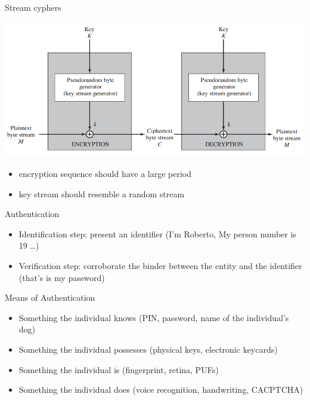\documentclass{beamer}
\begin{document}
\begin{frame}{Stream cyphers}
  \begin{center}
    \includegraphics[width=0.8\linewidth]{stream}
  \end{center}
  \begin{itemize}
    \item  encryption sequence should have a large period 
    \item  key stream should resemble a random stream
  \end{itemize}
\end{frame}

\begin{frame}{Authentication}
  \begin{itemize}
    \item Identification step: present an identifier (I'm Roberto, My person number is 19 \dots) 
    \item Verification step: corroborate the binder between the entity and the identifier (that's is my password)
  \end{itemize}
\end{frame}

\begin{frame}{Means of Authentication}
  \begin{itemize}
    \item Something the individual knows (PIN, password, name of the individual's dog) 
    \item Something the individual possesses (physical keys, electronic keycards)
    \item Something the individual is (fingerprint, retina, PUFs)
    \item Something the individual does (voice recognition, handwriting, CACPTCHA)
  \end{itemize}
\end{frame}
\end{document}
